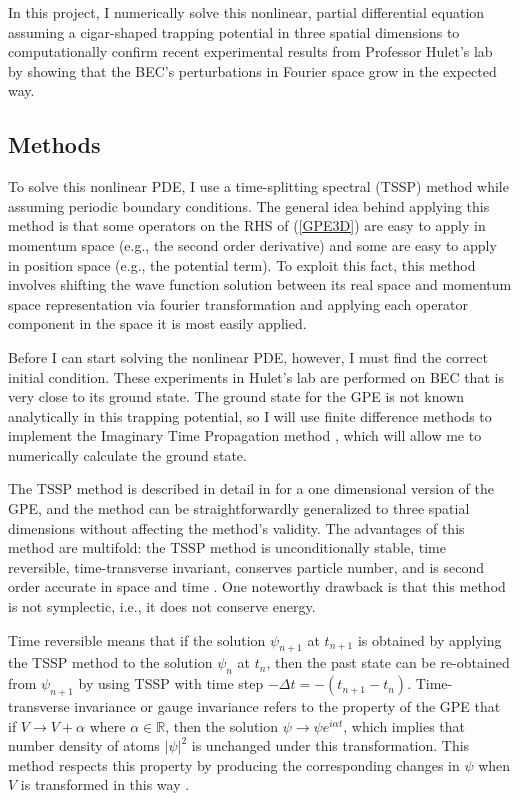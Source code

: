 \documentclass[12]{article}
\begin{document}
In this project, I numerically solve this nonlinear, partial differential equation assuming a cigar-shaped trapping potential in three spatial dimensions to computationally confirm recent experimental results from Professor Hulet's lab by showing that the BEC's perturbations in Fourier space grow in the expected way.

\subsection{Methods}

To solve this nonlinear PDE, I use a time-splitting spectral (TSSP) method while assuming periodic boundary conditions. The general idea behind applying this method is that some operators on the RHS of (\ref{GPE3D}) are easy to apply in momentum space (e.g., the second order derivative) and some are easy to apply in position space (e.g., the potential term). To exploit this fact, this method involves shifting the wave function solution between its real space and momentum space representation via fourier transformation and applying each operator component in the space it is most easily applied. 

Before I can start solving the nonlinear PDE, however, I must find the correct initial condition. These experiments in Hulet's lab are performed on BEC that is very close to its ground state. The ground state for the GPE is not known analytically in this trapping potential, so I will use finite difference methods to implement the Imaginary Time Propagation method \cite{chiofalo2000ground, muruganandam2009fortran}, which will allow me to numerically calculate the ground state.

The TSSP method is described in detail in \cite{bao2003numerical} for a one dimensional version of the GPE, and the method can be straightforwardly generalized to three spatial dimensions without affecting the method's validity. The advantages of this method are multifold: the TSSP method is unconditionally stable, time reversible, time-transverse invariant, conserves particle number, and is second order accurate in space and time \cite{bao2003numerical}. One noteworthy drawback is that this method is not symplectic, i.e., it does not conserve energy.

Time reversible means that if the solution $\psi_{n+1}$ at $t_{n+1}$ is obtained by applying the TSSP method to the solution $\psi_n$ at $t_n$, then the past state can be re-obtained from $\psi_{n+1}$ by using TSSP with time step $-\Delta t = -(t_{n+1} - t_n)$. Time-transverse invariance or gauge invariance refers to the property of the GPE that if $V \rightarrow V + \alpha$ where $\alpha \in \mathbb{R}$, then the solution $\psi \rightarrow \psi e^{i\alpha t}$, which implies that number density of atoms $|\psi|^2$ is unchanged under this transformation. This method respects this property by producing the corresponding changes in $\psi$ when $V$ is transformed in this way \cite{antoine2013computational}.
\end{document}

